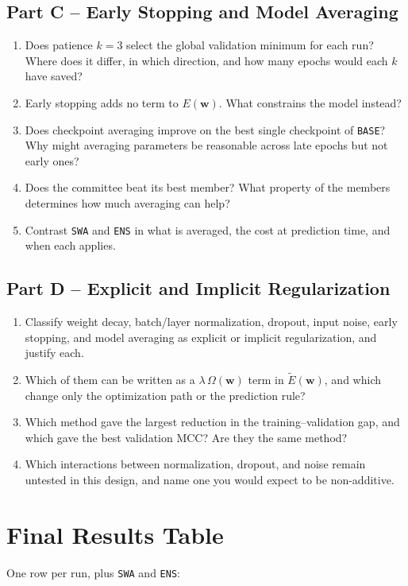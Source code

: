 \documentclass[11pt]{article}
\begin{document}
\subsection*{Part C -- Early Stopping and Model Averaging}
\begin{enumerate}
    \item Does patience $k=3$ select the global validation minimum for each run? Where does it differ, in which direction, and how many epochs would each $k$ have saved?
    \item Early stopping adds no term to $E(\mathbf{w})$. What constrains the model instead?
    \item Does checkpoint averaging improve on the best single checkpoint of \texttt{BASE}? Why might averaging parameters be reasonable across late epochs but not early ones?
    \item Does the committee beat its best member? What property of the members determines how much averaging can help?
    \item Contrast \texttt{SWA} and \texttt{ENS} in what is averaged, the cost at prediction time, and when each applies.
\end{enumerate}

\subsection*{Part D -- Explicit and Implicit Regularization}
\begin{enumerate}
    \item Classify weight decay, batch/layer normalization, dropout, input noise, early stopping, and model averaging as explicit or implicit regularization, and justify each.
    \item Which of them can be written as a $\lambda\,\Omega(\mathbf{w})$ term in $\widetilde{E}(\mathbf{w})$, and which change only the optimization path or the prediction rule?
    \item Which method gave the largest reduction in the training--validation gap, and which gave the best validation MCC? Are they the same method?
    \item Which interactions between normalization, dropout, and noise remain untested in this design, and name one you would expect to be non-additive.
\end{enumerate}

\section{Final Results Table}
One row per run, plus \texttt{SWA} and \texttt{ENS}:
\end{document}
